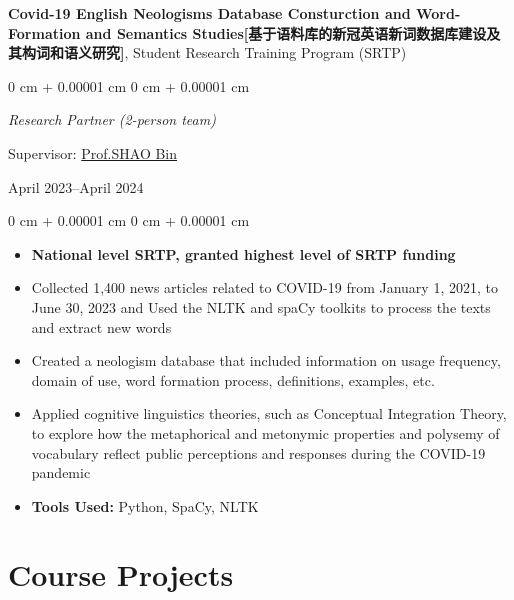 \documentclass[10pt, letterpaper]{article}
\newenvironment{highlights}{
    \begin{itemize}[
        topsep=0.10 cm,
        parsep=0.10 cm,
        partopsep=0pt,
        itemsep=0pt,
        leftmargin=0 cm + 10pt
    ]
}{
    \end{itemize}
} %
\newenvironment{onecolentry}{
    \begin{adjustwidth}{
        0 cm + 0.00001 cm
    }{
        0 cm + 0.00001 cm
    }
}{
    \end{adjustwidth}
} %
\newenvironment{twocolentry}[2][]{
    \onecolentry
    \def\secondColumn{#2}
    \setcolumnwidth{\fill, 4.5 cm}
    \begin{paracol}{2}
}{
    \switchcolumn \raggedleft \secondColumn
    \end{paracol}
    \endonecolentry
} %
\let\hrefWithoutArrow\href
\begin{document}
    \vspace{0.3 cm}

    \textbf{Covid-19 English Neologisms Database Consturction and Word-Formation and Semantics Studies[基于语料库的新冠英语新词数据库建设及其构词和语义研究]}, Student Research Training Program (SRTP)

    \vspace{0.10 cm}

    \begin{twocolentry}{
        April 2023–April 2024
    }
       \textit{Research Partner (2-person team)}
        \item Supervisor: \hrefWithoutArrow{https://person.zju.edu.cn/0019161#942922}{Prof.SHAO Bin}
    
    \end{twocolentry}

    \vspace{0.10 cm}
    \begin{onecolentry}
        \begin{highlights}
            \item \textbf{National level SRTP, granted highest level of SRTP funding}
            \item Collected 1,400 news articles related to COVID-19 from January 1, 2021, to June 30, 2023 and Used the NLTK and spaCy toolkits to process the texts and extract new words
            \item Created a neologism database that included information on usage frequency, domain of use, word formation process, definitions, examples, etc.
            \item Applied cognitive linguistics theories, such as Conceptual Integration Theory, to explore how the metaphorical and metonymic properties and polysemy of vocabulary reflect public perceptions and responses during the COVID-19 pandemic
            \item \textbf{Tools Used:} Python, SpaCy, NLTK
        \end{highlights}
    \end{onecolentry}
    
\section{Course Projects}
\end{document}
